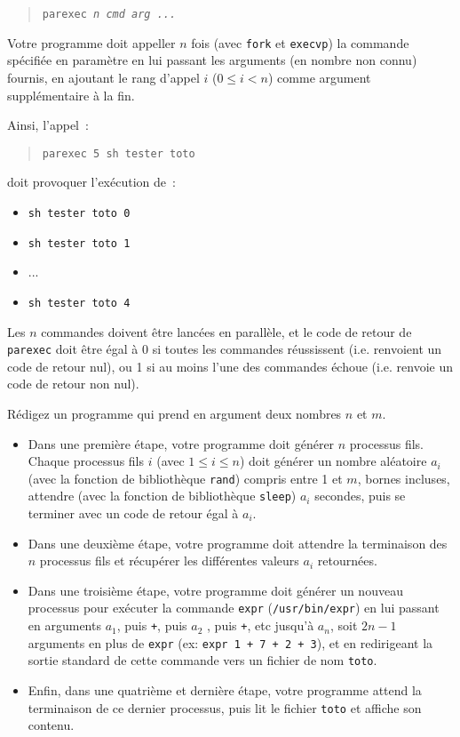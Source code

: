 \begin {quote}
    \texttt {parexec \textit {n cmd arg ...}}
\end {quote}

Votre programme doit appeller $n$ fois (avec \texttt {fork} et \texttt
{execvp}) la commande spécifiée en paramètre en lui passant les
arguments (en nombre non connu) fournis, en ajoutant le rang d'appel $i$
($0 \leq i < n$) comme argument supplémentaire à la fin.

Ainsi, l'appel~:

\begin {quote}
    \texttt {parexec 5 sh tester toto}
\end {quote}

doit provoquer l'exécution de~:

\begin {itemize}
    \item \texttt {sh tester toto 0}
    \item \texttt {sh tester toto 1}
    \item ...
    \item \texttt {sh tester toto 4}
\end {itemize}

Les $n$ commandes doivent être lancées en parallèle, et le code de
retour de \texttt {parexec} doit être égal à 0 si toutes les commandes
réussissent (i.e. renvoient un code de retour nul), ou 1 si au moins
l'une des commandes échoue (i.e. renvoie un code de retour non nul).


\question

Rédigez un programme qui prend en argument deux nombres $n$ et $m$.

\begin {itemize}
    \item Dans une première étape, votre programme doit générer
	$n$ processus fils. Chaque processus fils $i$ (avec $1 \leq
	i \leq n$) doit générer un nombre aléatoire $a_i$ (avec la
	fonction de bibliothèque \texttt {rand}) compris entre 1 et $m$,
	bornes incluses, attendre (avec la fonction de bibliothèque
	\texttt {sleep}) $a_i$ secondes, puis se terminer avec un code de
	retour égal à $a_i$.

    \item Dans une deuxième étape, votre programme doit attendre la
	terminaison des $n$ processus fils et récupérer les différentes
	valeurs $a_i$ retournées.

    \item Dans une troisième étape, votre programme doit générer un
	nouveau processus pour exécuter la commande \texttt {expr}
	(\texttt {/usr/bin/expr}) en lui passant en arguments $a_1$,
	puis \texttt {+}, puis $a_2$ , puis \texttt {+}, etc jusqu'à
	$a_n$, soit $2n-1$ arguments en plus de \texttt {expr} (ex:
	\verb*|expr 1 + 7 + 2 + 3|), et en redirigeant la sortie
	standard de cette commande vers un fichier de nom \texttt {toto}.

    \item Enfin, dans une quatrième et dernière étape, votre programme
	attend la terminaison de ce dernier processus, puis lit le
	fichier \texttt {toto} et affiche son contenu.

\end {itemize}

